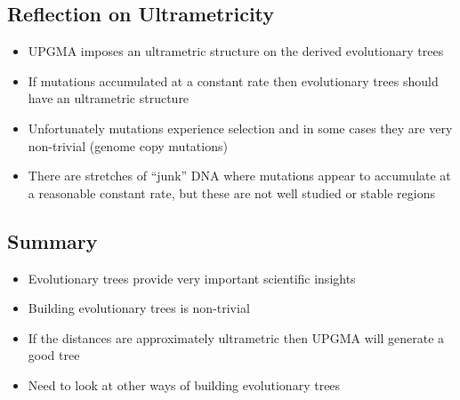 
\begin{slide}
\section{Reflection on Ultrametricity}

\begin{PauseHighLight}
  \begin{itemize}
  \item UPGMA imposes an ultrametric structure on the derived
    evolutionary trees\pause
  \item If mutations accumulated at a constant rate then evolutionary
    trees should have an ultrametric structure\pause
  \item Unfortunately mutations experience selection and in some cases
    they are very non-trivial (genome copy mutations)\pause
  \item There are stretches of ``junk'' DNA where mutations appear to
    accumulate at a reasonable constant rate, but these are not well
    studied or stable regions\pause
  \end{itemize}
\end{PauseHighLight}

\end{slide}



\begin{slide}
\section{Summary}

\begin{PauseHighLight}
  \begin{itemize}
  \item Evolutionary trees provide very important scientific insights\pause
  \item Building evolutionary trees is non-trivial\pause
  \item If the distances are approximately ultrametric then UPGMA will
    generate a good tree\pause
  \item Need to look at other ways of building evolutionary trees\pause
  \end{itemize}
\end{PauseHighLight}

\end{slide}


